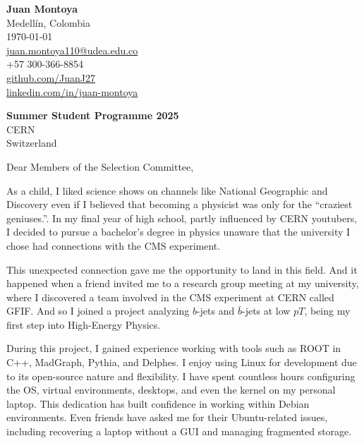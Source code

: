 \documentclass[11pt]{report}
\begin{document}
\begin{titlepage}

    \begin{minipage}[t]{0.95\textwidth}
        \hfill
        \raggedleft
        \textbf{Juan Montoya} \\
        Medellín, Colombia \\
        \today\\
        \href{mailto:juan.montoya110@udea.edu.co}{juan.montoya110@udea.edu.co} \\
        +57 300-366-8854 \\
        \href{https://github.com/JuanJ27}{github.com/JuanJ27} \\
        \href{https://www.linkedin.com/in/juan-montoya-68262071/}{linkedin.com/in/juan-montoya}
    \end{minipage}

\raggedright \textbf{Summer Student Programme 2025} \\ CERN \\ Switzerland

\vspace{0.7em}

\raggedright Dear Members of the Selection Committee,\\

\vspace{0.4em}

As a child, I liked science shows on channels like National Geographic and Discovery even if I believed that becoming a physicist was only for the “craziest geniuses.”. In my final year of high school, partly influenced by CERN youtubers, I decided to pursue a bachelor’s degree in physics unaware that the university I chose had connections with the CMS experiment.

\vspace{0.4em}

This unexpected connection gave me the opportunity to land in this field. And it happened when a friend invited me to a research group meeting at my university, where I discovered a team involved in the CMS experiment at CERN called GFIF. And so I joined a project analyzing \(b\)-jets and \(\bar{b}\)-jets at low $pT$, being my first step into High-Energy Physics.

\vspace{0.7em}

During this project, I gained experience working with tools such as ROOT in C++, MadGraph, Pythia, and Delphes. I enjoy using Linux for development due to its open-source nature and flexibility. I have spent countless hours configuring the OS, virtual environments, desktops, and even the kernel on my personal laptop. This dedication has built confidence in working within Debian environments. Even friends have asked me for their Ubuntu-related issues, including recovering a laptop without a GUI and managing fragmented storage.


\end{titlepage}
\end{document}
